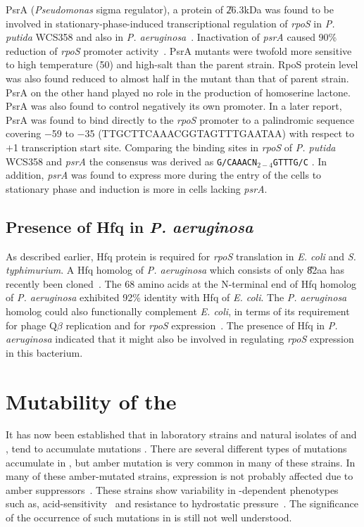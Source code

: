 PsrA (\emph{Pseudomonas} sigma regulator), a protein of
\U{26.3}{kDa} was found to be involved in stationary-phase-induced
transcriptional regulation of \emph{rpoS} in \emph{P. putida}
WCS358 and also in \emph{P. aeruginosa}~\citep{Kojic2001,
Kojic2002}. Inactivation of \emph{psrA} caused 90\% reduction of
\emph{rpoS} promoter activity~\citep{Kojic2001}. PsrA mutants were
twofold more sensitive to high temperature (50\dg{}) and high-salt
than the parent strain. RpoS protein level was also found reduced
to almost half in the mutant than that of parent strain. PsrA on
the other hand played no role in the production of homoserine
lactone. PsrA was also found to control negatively its own
promoter. In a later report, PsrA was found to bind directly to
the \emph{rpoS} promoter to a palindromic sequence covering $-$59
to $-$35 (TTGCTTCAAACGGTAGTTTGAATAA) with respect to $+$1
transcription start site. Comparing the binding sites in
\emph{rpoS} of \emph{P. putida} WCS358 and \emph{psrA} the
consensus was derived as {\small\texttt{G/CAAACN$_{2-4}$GTTTG/C}}
\citep{Kojic2002}. In addition, \emph{psrA} was found to express
more during the entry of the cells to stationary phase and
induction is more in cells lacking \emph{psrA}.

\subsection{Presence of Hfq in \emph{P. aeruginosa}}

As described earlier, Hfq protein is required for \emph{rpoS}
translation in \emph{E. coli} and \emph{S. typhimurium}. A Hfq
homolog of \emph{P. aeruginosa} which consists of only \U{82}{aa}
has recently been cloned~\citep{Sonn2002}. The 68 amino acids at
the N-terminal end of Hfq homolog of \emph{P. aeruginosa}
exhibited 92\% identity with Hfq of \emph{E. coli}. The \emph{P.
aeruginosa} homolog could also functionally complement \emph{E.
coli}, in terms of its requirement for phage Q$\beta$ replication
and for \emph{rpoS} expression~\citep{Sonn2002}. The presence of
Hfq in \emph{P. aeruginosa} indicated that it might also be
involved in regulating \emph{rpoS} expression in this bacterium.

\section{Mutability of the }
\label{chap1:rpos_mutation}

It has now been established that  in laboratory strains
and natural isolates of  and , tend to
accumulate mutations
\citep{Jishage1997,Ivanova1992,Visick1997,Atlung2002,Jorgensen2000,Sutton2000}.
There are several different types of mutations accumulate in
, but amber mutation is very common in many of these
strains. In many of these amber-mutated  strains, 
expression is not probably affected due to amber
suppressors~\citep{Rod1988}. These strains show variability in
-dependent phenotypes such as,
acid-sensitivity~\citep{Waterman1996} and resistance to
hydrostatic pressure~\citep{Robey2001}. The significance of the
occurrence of such mutations in  is still not well
understood.


